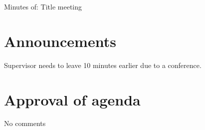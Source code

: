 \documentclass[11pt,a4paper]{article}
\begin{document}
\begin{Minutes}{Minutes of: Title meeting}





\maketitle



\newpage

\section{Announcements} %
Supervisor needs to leave 10 minutes earlier due to a conference.

\section{Approval of agenda} %
No comments


\end{Minutes}
\end{document}
